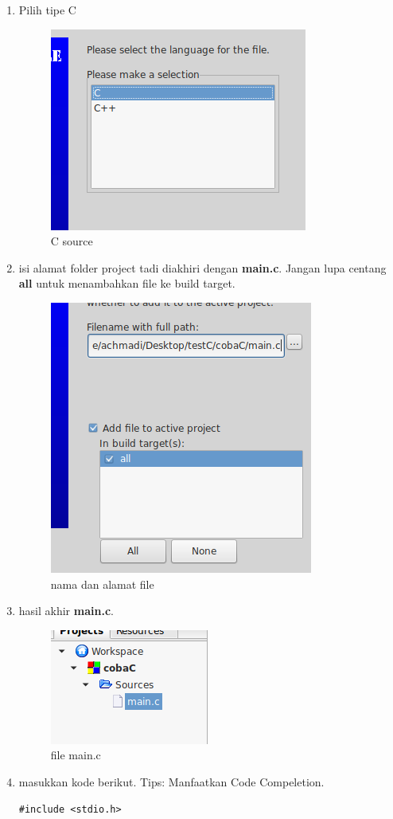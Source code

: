 \documentclass[12pt,]{article}
\begin{document}
\begin{enumerate}
		\item Pilih tipe C
		\begin{figure}[H]
			\centering
			\includegraphics[width=0.35\linewidth]{images/c_cb_6}
			\caption{C source}
		\end{figure}
		\item isi alamat folder project tadi diakhiri dengan \textbf{main.c}.
		Jangan lupa centang \textbf{all} untuk menambahkan file ke build target.
		\begin{figure}[H]
			\centering
			\includegraphics[width=0.35\linewidth]{images/c_cb_7}
			\caption{nama dan alamat file}
		\end{figure}
	    
		\item hasil akhir \textbf{main.c}.
		\begin{figure}[H]
			\centering
			\includegraphics[width=0.35\linewidth]{images/c_cb_8}
			\caption{file main.c}
		\end{figure}
	
		\item masukkan kode berikut.
		Tips: Manfaatkan Code Compeletion.
		\begin{verbatim}
#include <stdio.h>


\end{verbatim}
\end{enumerate}
\end{document}
